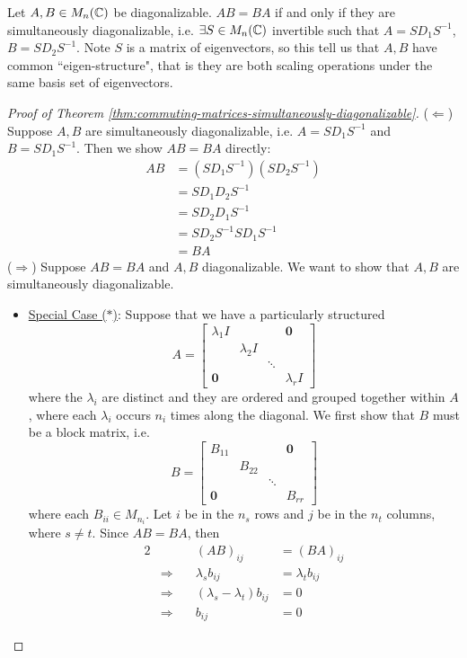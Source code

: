 \begin{theorem}
\label{thm:commuting-matrices-simultaneously-diagonalizable}
Let $A,B \in M_n(\mathbb C)$ be diagonalizable. $AB = BA$ if and only if they are simultaneously diagonalizable, i.e. $\exists S \in M_n(\mathbb C)$ invertible such that $A = SD_1S^{-1}$, $B = SD_2S^{-1}$. Note $S$ is a matrix of eigenvectors, so this tell us that $A, B$ have common ``eigen-structure", that is they are both scaling operations under the same basis set of eigenvectors.
\end{theorem}

\begin{proof}[Proof of Theorem \ref{thm:commuting-matrices-simultaneously-diagonalizable}]
($\Longleftarrow$) Suppose $A, B$ are simultaneously diagonalizable, i.e.
$A = SD_1S^{-1}$ and $B = SD_1S^{-1}$. Then we show $AB = BA$ directly:
\begin{align*}
    AB &= (SD_1S^{-1})(SD_2S^{-1}) \\
       &= SD_1D_2S^{-1} \\
       &= SD_2D_1S^{-1} \\
       &= SD_2S^{-1}SD_1S^{-1} \\
       &= BA
\end{align*}
($\Longrightarrow$) Suppose $AB = BA$ and $A, B$ diagonalizable. We want to show that $A, B$ are simultaneously diagonalizable.
\begin{itemize}
    \item \underline{Special Case ($*$)}: Suppose that we have a particularly structured 
    $$
    A = \begin{bmatrix}
    \lambda_1 I & & & \textbf{0} \\
    & \lambda_2 I & & \\
    & & \ddots & \\
    \textbf{0} & & & \lambda_r I
    \end{bmatrix}
    $$
    where the $\lambda_i$ are distinct and they are ordered and grouped together within $A$, where each $\lambda_i$ occurs $n_i$ times along the diagonal. We first show that $B$ must be a block matrix, i.e.
    $$
    B = \begin{bmatrix}
    B_{11} & & & \textbf{0} \\
    & B_{22} & & \\
    & & \ddots & \\
    \textbf{0} & & & B_{rr}
    \end{bmatrix}
    $$
    where each $B_{ii} \in M_{n_i}$. Let $i$ be in the $n_s$ rows and $j$ be in the $n_t$ columns, where $s \not= t$. Since $AB = BA$, then
    \begin{alignat*}{2}
        &&(AB)_{ij} &= (BA)_{ij} \\
        &\Longrightarrow \quad & \lambda_s b_{ij} &= \lambda_t b_{ij} \\
        &\Longrightarrow \quad & (\lambda_s - \lambda_t) b_{ij} &= 0 \\
        &\Longrightarrow \quad & b_{ij} &= 0
    \end{alignat*}
    

\end{itemize}
\end{proof}
